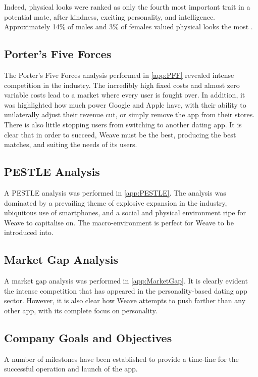 \documentclass[12pt, a4paper]{article}
\let\cite\shortcite
\newenvironment{main}
{\begin{spacing}{1.2}\setlength{\parskip}{0.5\baselineskip}}
{\end{spacing}\setlength{\parskip}{0pt}}
\begin{document}
\begin{main}
Indeed, physical looks were ranked as only the fourth most important trait in a potential mate, after kindness, exciting personality, and intelligence. Approximately 14\% of males and 3\% of females valued physical looks the most \cite{LooksVsPersonality}.

\subsection{Porter's Five Forces}
The Porter's Five Forces analysis performed in \cref{app:PFF} revealed intense competition in the industry. The incredibly high fixed costs and almost zero variable costs lead to a market where every user is fought over. In addition, it was highlighted how much power Google and Apple have, with their ability to unilaterally adjust their revenue cut, or simply remove the app from their stores. There is also little stopping users from switching to another dating app. It is clear that in order to succeed, Weave must be the best, producing the best matches, and suiting the needs of its users.

\subsection{PESTLE Analysis}
A PESTLE analysis was performed in \cref{app:PESTLE}. The analysis was dominated by a prevailing theme of explosive expansion in the industry, ubiquitous use of smartphones, and a social and physical environment ripe for Weave to capitalise on. The macro-environment is perfect for Weave to be introduced into.

\subsection{Market Gap Analysis}
A market gap analysis was performed in \cref{app:MarketGap}. It is clearly evident the intense competition that has appeared in the personality-based dating app sector. However, it is also clear how Weave attempts to push farther than any other app, with its complete focus on personality.

\subsection{Company Goals and Objectives}
A number of milestones have been established to provide a time-line for the successful operation and launch of the app.


\end{main}
\end{document}
